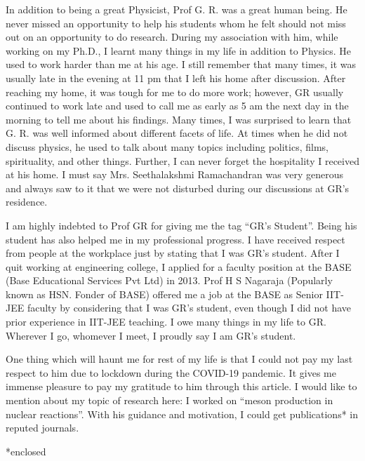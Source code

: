 In addition to being a great Physicist, Prof G. R. was a great human being. He never missed an opportunity to help his students whom he felt should not miss out on an opportunity to do research. During my association with him, while working on my Ph.D., I learnt many things in my life in addition to Physics. He used to work harder than me at his age. I still remember that many times, it was usually late in the evening at 11 pm that I left his home after discussion. After reaching my home, it was tough for me to do more work; however, GR usually continued to work late and used to call me as early as 5 am the next day in the morning to tell me about his findings. Many times, I was surprised to learn that G. R. was well informed about different facets of life. At times when he did not discuss physics, he used to talk about many topics including politics, films, spirituality, and other things. Further, I can never forget the hospitality I received at his home. I must say Mrs. Seethalakshmi Ramachandran was very generous and always saw to it that we were not disturbed during our discussions at GR’s residence.

I am highly indebted to Prof GR for giving me the tag “GR’s Student”. Being his student has also helped me in my professional progress. I have received respect from people at the workplace just by stating that I was GR’s student. After I quit working at engineering college, I applied for a faculty position at the BASE (Base Educational Services Pvt Ltd) in 2013. Prof H S Nagaraja (Popularly known as HSN. Fonder of BASE) offered me a job at the BASE as Senior IIT-JEE faculty by considering that I was GR’s student, even though I did not have prior experience in IIT-JEE teaching. I owe many things in my life to GR. Wherever I go, whomever I meet, I proudly say I am GR’s student. 

One thing which will haunt me for rest of my life is that I could not pay my last respect to him due to lockdown during the COVID-19 pandemic. It gives me immense pleasure to pay my gratitude to him through this article. I would like to mention about my topic of research here: I worked on “meson production in nuclear reactions”. With his guidance and motivation, I could get publications* in reputed journals. 


*enclosed




